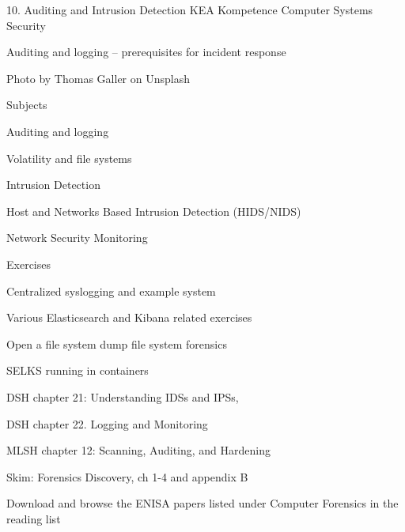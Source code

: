 \documentclass[Screen16to9,17pt]{foils}
\begin{document}
\mytitlepage
{10. Auditing and Intrusion Detection}
{KEA Kompetence Computer Systems Security \the\year}





\begin{list2}
\item Auditing and logging -- prerequisites for incident response
\end{list2}

{\small\hfill  Photo by Thomas Galler on Unsplash}


\begin{list1}
\item Subjects
\begin{list2}
\item Auditing and logging
\item Volatility and file systems
\item Intrusion Detection
\item Host and Networks Based Intrusion Detection (HIDS/NIDS)
\item Network Security Monitoring
\end{list2}
\item Exercises
\begin{list2}
\item Centralized syslogging and example system
\item Various Elasticsearch and Kibana related exercises
\item Open a file system dump file system forensics
\item SELKS running in containers
\end{list2}
\end{list1}




\begin{list1}

\item DSH chapter 21: Understanding IDSs and IPSs,
\item DSH chapter 22. Logging and Monitoring
\item MLSH chapter 12: Scanning, Auditing, and Hardening
\item Skim: Forensics Discovery, ch 1-4 and appendix B
\item Download and browse the ENISA papers listed under Computer Forensics in the reading list
\end{list1}
\end{document}
